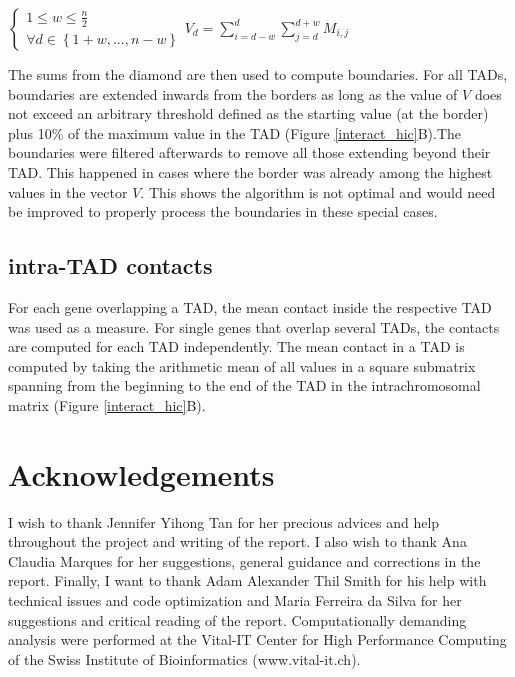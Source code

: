 \documentclass[11pt,a4paper]{report}
\begin{document}
\vspace{0.2in}
$\left\{\begin{matrix}1\leq w\leq \frac{n}{2} \\ \forall d\in\left \{ 1+w , ... , n-w \right \}\end{matrix}\right. V_{d}=\sum_{i=d-w}^{d}\sum_{j=d}^{d+w}M_{i,j}$
\vspace{0.2in}

\noindent The sums from the diamond are then used to compute boundaries. For all TADs, boundaries are extended inwards from the borders as long as the value of $V$ does not exceed an arbitrary threshold defined as the starting value (at the border) plus 10\% of the maximum value in the TAD (Figure \ref{interact_hic}B).The boundaries were filtered afterwards to remove all those extending beyond their TAD. This happened in cases where the border was already among the highest values in the vector $V$. This shows the algorithm is not optimal and would need be improved to properly process the boundaries in these special cases. 

\subsection*{intra-TAD contacts}

For each gene overlapping a TAD, the mean contact inside the respective TAD was used as a measure. For single genes that overlap several TADs, the contacts are computed for each TAD independently. The mean contact in a TAD is computed by taking the arithmetic mean of all values in a square submatrix spanning from the beginning to the end of the TAD in the intrachromosomal matrix (Figure \ref{interact_hic}B).

\section*{Acknowledgements}
I wish to thank Jennifer Yihong Tan for her precious advices and help throughout the project and writing of the report. I also wish to thank Ana Claudia Marques for her suggestions, general guidance and corrections in the report. Finally, I want to thank Adam Alexander Thil Smith for  his help with technical issues and code optimization and Maria Ferreira da Silva for her suggestions and critical reading of the report.
Computationally demanding analysis were performed at the Vital-IT Center for High Performance Computing of the Swiss Institute of Bioinformatics (www.vital-it.ch).


\fancyhead[L]{\slshape }

\end{document}
